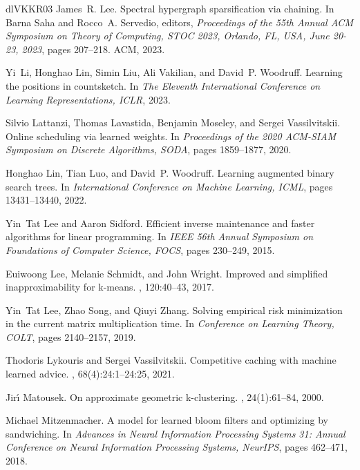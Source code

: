 \documentclass[10pt,a4paper]{amsart}
\begin{document}
\begin{thebibliography}{dlVKKR03}
James~R. Lee.
\newblock Spectral hypergraph sparsification via chaining.
\newblock In Barna Saha and Rocco~A. Servedio, editors, {\em Proceedings of the 55th Annual {ACM} Symposium on Theory of Computing, {STOC} 2023, Orlando, FL, USA, June 20-23, 2023}, pages 207--218. {ACM}, 2023.

Yi~Li, Honghao Lin, Simin Liu, Ali Vakilian, and David~P. Woodruff.
\newblock Learning the positions in countsketch.
\newblock In {\em The Eleventh International Conference on Learning Representations, {ICLR}}, 2023.

Silvio Lattanzi, Thomas Lavastida, Benjamin Moseley, and Sergei Vassilvitskii.
\newblock Online scheduling via learned weights.
\newblock In {\em Proceedings of the 2020 {ACM-SIAM} Symposium on Discrete Algorithms, {SODA}}, pages 1859--1877, 2020.

Honghao Lin, Tian Luo, and David~P. Woodruff.
\newblock Learning augmented binary search trees.
\newblock In {\em International Conference on Machine Learning, {ICML}}, pages 13431--13440, 2022.

Yin~Tat Lee and Aaron Sidford.
\newblock Efficient inverse maintenance and faster algorithms for linear programming.
\newblock In {\em {IEEE} 56th Annual Symposium on Foundations of Computer Science, {FOCS}}, pages 230--249, 2015.

Euiwoong Lee, Melanie Schmidt, and John Wright.
\newblock Improved and simplified inapproximability for k-means.
, 120:40--43, 2017.

Yin~Tat Lee, Zhao Song, and Qiuyi Zhang.
\newblock Solving empirical risk minimization in the current matrix multiplication time.
\newblock In {\em Conference on Learning Theory, {COLT}}, pages 2140--2157, 2019.

Thodoris Lykouris and Sergei Vassilvitskii.
\newblock Competitive caching with machine learned advice.
, 68(4):24:1--24:25, 2021.

Jir{\'{\i}} Matousek.
\newblock On approximate geometric k-clustering.
, 24(1):61--84, 2000.

Michael Mitzenmacher.
\newblock A model for learned bloom filters and optimizing by sandwiching.
\newblock In {\em Advances in Neural Information Processing Systems 31: Annual Conference on Neural Information Processing Systems, NeurIPS}, pages 462--471, 2018.


\end{thebibliography}
\end{document}
